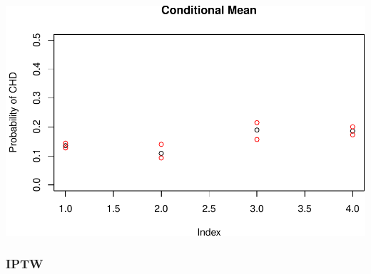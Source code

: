 \documentclass[]{article}
\begin{document}
\includegraphics{framingham_files/figure-latex/unnamed-chunk-7-1.pdf}

\subsubsection{IPTW}\label{iptw}
\end{document}
